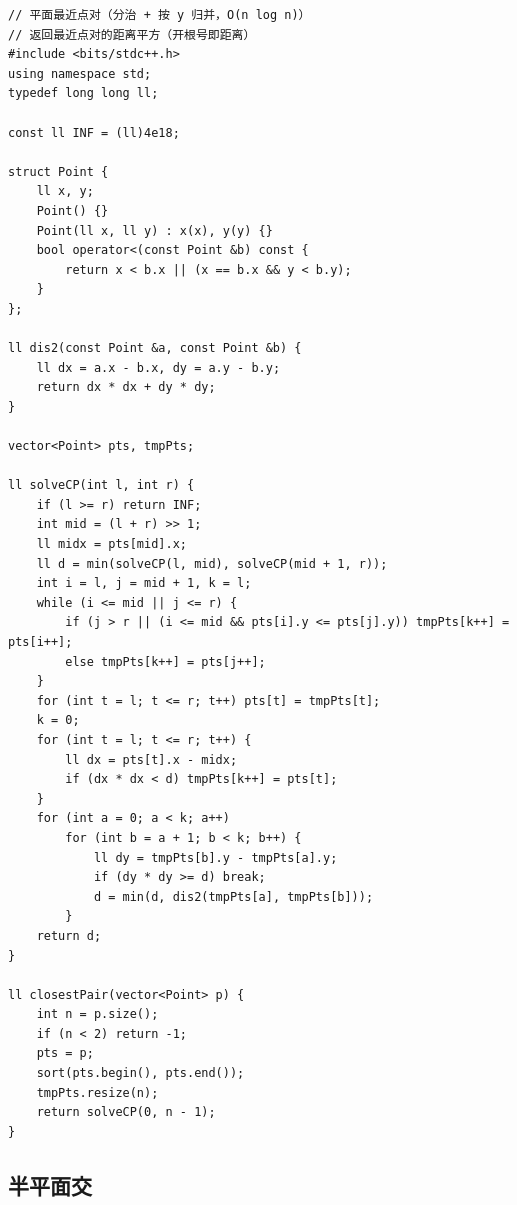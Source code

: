 \documentclass[11pt,a4paper]{ctexart}
\begin{document}
\begin{lstlisting}
// 平面最近点对（分治 + 按 y 归并，O(n log n)）
// 返回最近点对的距离平方（开根号即距离）
#include <bits/stdc++.h>
using namespace std;
typedef long long ll;

const ll INF = (ll)4e18;

struct Point {
    ll x, y;
    Point() {}
    Point(ll x, ll y) : x(x), y(y) {}
    bool operator<(const Point &b) const {
        return x < b.x || (x == b.x && y < b.y);
    }
};

ll dis2(const Point &a, const Point &b) {
    ll dx = a.x - b.x, dy = a.y - b.y;
    return dx * dx + dy * dy;
}

vector<Point> pts, tmpPts;

ll solveCP(int l, int r) {
    if (l >= r) return INF;
    int mid = (l + r) >> 1;
    ll midx = pts[mid].x;
    ll d = min(solveCP(l, mid), solveCP(mid + 1, r));
    int i = l, j = mid + 1, k = l;
    while (i <= mid || j <= r) {
        if (j > r || (i <= mid && pts[i].y <= pts[j].y)) tmpPts[k++] = pts[i++];
        else tmpPts[k++] = pts[j++];
    }
    for (int t = l; t <= r; t++) pts[t] = tmpPts[t];
    k = 0;
    for (int t = l; t <= r; t++) {
        ll dx = pts[t].x - midx;
        if (dx * dx < d) tmpPts[k++] = pts[t];
    }
    for (int a = 0; a < k; a++)
        for (int b = a + 1; b < k; b++) {
            ll dy = tmpPts[b].y - tmpPts[a].y;
            if (dy * dy >= d) break;
            d = min(d, dis2(tmpPts[a], tmpPts[b]));
        }
    return d;
}

ll closestPair(vector<Point> p) {
    int n = p.size();
    if (n < 2) return -1;
    pts = p;
    sort(pts.begin(), pts.end());
    tmpPts.resize(n);
    return solveCP(0, n - 1);
}
\end{lstlisting}

\subsection{半平面交}
\end{document}

